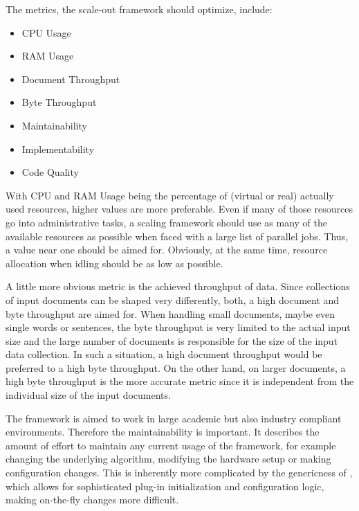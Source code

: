The metrics, the scale-out framework should optimize, include:
\begin{itemize}
\item CPU Usage
\item RAM Usage
\item Document Throughput
\item Byte Throughput
\item Maintainability
\item Implementability
\item Code Quality
\end{itemize}
With CPU and RAM Usage being the percentage of (virtual or real) actually used resources, higher values are more preferable. Even if many of those resources go into administrative tasks, a scaling framework should use as many of the available resources as possible when faced with a large list of parallel jobs. Thus, a value near one should be aimed for. Obviously, at the same time, resource allocation when idling should be as low as possible.

A little more obvious metric is the achieved throughput of data. Since collections of input documents can be shaped very differently, both, a high document and byte throughput are aimed for. When handling small documents, maybe even single words or sentences, the byte throughput is very limited to the actual input size and the large number of documents is responsible for the size of the input data collection. In such a situation, a high document throughput would be preferred to a high byte throughput. On the other hand, on larger documents, a high byte throughput is the more accurate metric since it is independent from the individual size of the input documents.

The framework is aimed to work in large academic but also industry compliant environments. Therefore the maintainability is important. It describes the amount of effort to maintain any current usage of the framework, for example changing the underlying \nlp{} algorithm, modifying the hardware setup or making configuration changes. This is inherently more complicated by the genericness of \uima{}, which allows for sophisticated plug-in initialization and configuration logic, making on-the-fly changes more difficult.

